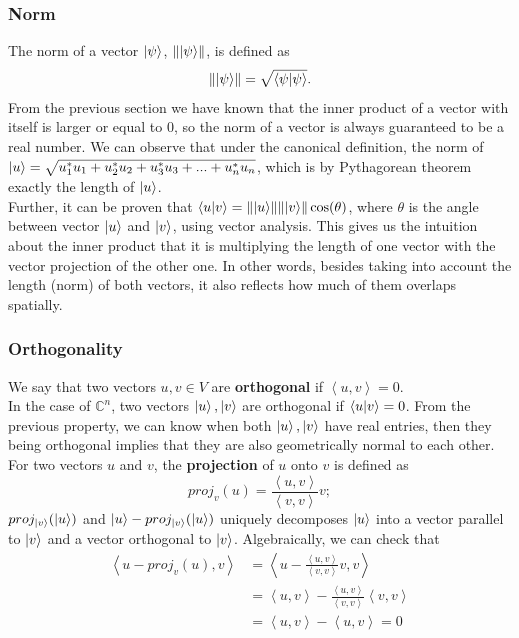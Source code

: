 \documentclass[12pt]{article}
\newcommand{\inner}[2]{\left< #1, #2\right>}
\begin{document}
\subsubsection{Norm}
The norm of a vector $\ket{\psi}$, $\norm{\ket{\psi}}$, is defined as $$\norm{\ket{\psi}}=\sqrt{\braket{\psi}{\psi}}.$$ From the previous section we have known that the inner product of a vector with itself is larger or equal to 0, so the norm of a vector is always guaranteed to be a real number. We can observe that under the canonical definition, the norm of $\ket{u}=\sqrt{u_1^*u_1+u_2^*u_2+u_3^*u_3+...+u_n^*u_n}$, which is by Pythagorean theorem exactly the length of $\ket{u}$.\\

\noindent Further, it can be proven that $\braket{u}{v}=\norm{\ket{u}} \norm{\ket{v}} \cos(\theta)$, where $\theta$ is the angle between vector $\ket{u}$ and $\ket{v}$, using vector analysis. This gives us the intuition about the inner product that it is multiplying the length of one vector with the vector projection of the other one. In other words, besides taking into account the length (norm) of both vectors, it also reflects how much of them overlaps spatially.
\subsubsection{Orthogonality}
We say that two vectors $u, v\in V$ are \textbf{orthogonal} if $\left<u,v\right>=0$.\\
In the case of $\mathbb{C}^n$, two vectors $\ket{u}, \ket{v}$ are orthogonal if $\braket{u}{v}=0$. From the previous property, we can know when both $\ket{u}, \ket{v}$ have real entries, then they being orthogonal implies that they are also geometrically normal to each other.\\

\noindent For two vectors $u$ and $v$, the \textbf{projection} of $u$ onto $v$ is defined as $$proj_{v}(u)=\frac{\left<u,v\right>}{\left<v,v\right>}v;$$
$proj_{\ket{v}}(\ket{u})$ and $\ket{u}-proj_{\ket{v}}(\ket{u})$ uniquely decomposes $\ket{u}$ into a vector parallel to $\ket{v}$ and a vector orthogonal to $\ket{v}$. Algebraically, we can check that \begin{align*}
\inner{u-proj_{v}(u)}{v}&=\inner{u-\frac{\inner{u}{v}}{\inner{v}{v}}v}{v}\\
&=\inner{u}{v}-\frac{\left<u,v\right>}{\left<v,v\right>}\inner{v}{v}\\
&=\inner{u}{v}-\inner{u}{v}=0
\end{align*}
\end{document}
